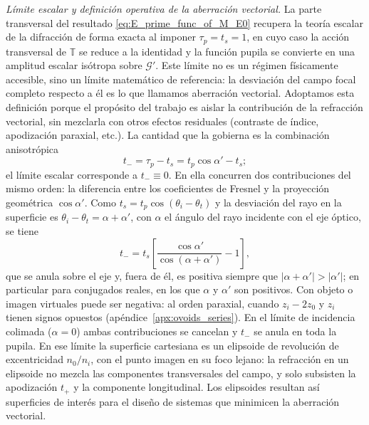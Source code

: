 \noindent\textit{Límite escalar y definición operativa de la aberración vectorial.}
La parte transversal del resultado \eqref{eq:E_prime_func_of_M_E0} recupera la
teoría escalar de la difracción de forma exacta al imponer $\tau_p=t_s=1$, en
cuyo caso la acción transversal de $\mathbb T$ se reduce a la identidad y la
función pupila se convierte en una amplitud escalar isótropa sobre
$\mathscr G'$. Este límite no es un régimen físicamente accesible, sino un
límite matemático de referencia: la desviación del campo focal completo
respecto a él es lo que llamamos aberración vectorial. Adoptamos esta
definición porque el propósito del trabajo es aislar la contribución de la
refracción vectorial, sin mezclarla con otros efectos residuales (contraste de
índice, apodización paraxial, etc.). La cantidad que la gobierna es la
combinación anisotrópica
\begin{equation}
  t_-=\tau_p-t_s=t_p\cos\alpha'-t_s ;
\end{equation}
el límite escalar corresponde a $t_-\equiv 0$. En ella concurren dos
contribuciones del mismo orden: la diferencia entre los coeficientes de
Fresnel y la proyección geométrica $\cos\alpha'$. Como
$t_s=t_p\cos(\theta_i-\theta_t)$ y la desviación del rayo en la superficie es
$\theta_i-\theta_t=\alpha+\alpha'$, con $\alpha$ el ángulo del rayo incidente
con el eje óptico, se tiene
\begin{equation}
  t_-
  =
  t_s\left[\frac{\cos\alpha'}{\cos(\alpha+\alpha')}-1\right],
  \label{eq:t_minus_deviation_identity}
\end{equation}
que se anula sobre el eje y, fuera de él, es positiva siempre que
$|\alpha+\alpha'|>|\alpha'|$; en particular para conjugados reales, en los que
$\alpha$ y $\alpha'$ son positivos. Con objeto o imagen virtuales puede ser
negativa: al orden paraxial, cuando $z_i-2z_0$ y $z_i$ tienen signos opuestos
(apéndice~\ref{apx:ovoids_series}). En el límite de incidencia colimada
($\alpha=0$) ambas contribuciones se cancelan y $t_-$ se anula en toda la
pupila. En ese límite la superficie cartesiana es un
elipsoide de revolución de excentricidad $n_0/n_i$, con el punto imagen en su
foco lejano: la refracción en un elipsoide no mezcla las componentes
transversales del campo, y solo subsisten la apodización $t_+$ y la componente
longitudinal. Los elipsoides resultan así superficies de interés para el
diseño de sistemas que minimicen la aberración vectorial.

\medskip

